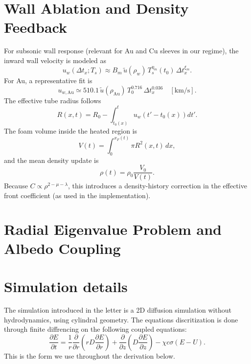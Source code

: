 \documentclass[11pt]{article}
\begin{document}
\section{Wall Ablation and Density Feedback}
For subsonic wall response (relevant for Au and Cu sleeves in our regime), the inward wall velocity is modeled as
\begin{equation}
u_w(\Delta t_x;T_s)\approx B_m\,\tilde u(\rho_w)\,T_s^{\eta_m}(t_0)\,\Delta t_x^{\xi_m}.
\label{eq:uw_generic_appendix}
\end{equation}
For Au, a representative fit is
\begin{equation}
u_{w,\mathrm{Au}}\simeq510.1\,\tilde u(\rho_{\mathrm{Au}})\,T_0^{0.716}\,\Delta t_x^{0.036}
\quad [\mathrm{km/s}].
\end{equation}
The effective tube radius follows
\begin{equation}
R(x,t)=R_0-\int_{t_0(x)}^t u_w\!\left(t'-t_0(x)\right)dt'.
\label{eq:R_xt_appendix}
\end{equation}
The foam volume inside the heated region is
\begin{equation}
V(t)=\int_0^{x_F(t)}\pi R^2(x,t)\,dx,
\end{equation}
and the mean density update is
\begin{equation}
\rho(t)=\rho_0\frac{V_0}{V(t)}.
\label{eq:rho_update_appendix}
\end{equation}
Because $C\propto\rho^{2-\mu-\lambda}$, this introduces a density-history correction in the effective front coefficient (as used in the implementation).

\section{Radial Eigenvalue Problem and Albedo Coupling}


\section{Simulation details}
The simulation introduced in the letter is a 2D diffusion simulation without hydrodynamics, using cylindral geometry. The equations discritization is done through finite diffrencing on the following coupled equations:
\begin{equation}
\frac{\partial E}{\partial t}
=
\frac{1}{r}\frac{\partial}{\partial r}\left(rD\frac{\partial E}{\partial r}\right) + \frac{\partial}{\partial z}\left(D\frac{\partial E}{\partial z}\right)
-
\chi c\sigma(E - U).
\label{eq:E_continuous_conservative}
\end{equation}
This is the form we use throughout the derivation below.
\end{document}
